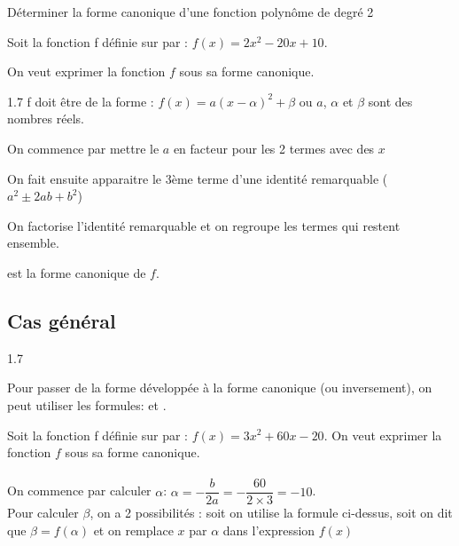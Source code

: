     \begin{bmethodet}{Déterminer la forme canonique d'une fonction polynôme de degré 2}
        
        Soit la fonction f définie sur \R par : $f(x)=2x^2-20x+10$.
        
        On veut exprimer la fonction $f$ sous sa forme canonique.
        
        
        \begin{spacing}{1.7}
        f doit être de la forme : 	
 		$f(x)=a(x-\alpha)^2+\beta$ 	
 		ou $a$, $\alpha$ et $\beta$ sont des nombres réels.
        
        On commence par mettre le $a$ en facteur pour les 2 termes avec des $x$
        
        \pointille[\textwidth]
          
        On fait ensuite apparaitre le 3ème terme d'une identité remarquable ($a^2\pm2ab+b^2$)
        
        \pointille[\textwidth]
        
        On factorise l'identité remarquable et on regroupe les termes qui restent ensemble.
        
        \pointille[\textwidth]
        
        \pointille[\textwidth]
        
        \pointille[\textwidth]

        \pointille[6cm] est la forme canonique de $f$.
    	\end{spacing}
    \end{bmethodet}


	\subsection{Cas général}
	
	\begin{spacing}{1.7}
	\begin{bprop}
		Pour passer de la forme développée à la forme canonique (ou inversement), on peut utiliser les formules:
		\pointille[5cm] et \pointille[5cm].\\
	\end{bprop}
	\end{spacing}

	\begin{bexemple}
		Soit la fonction f définie sur \R par : $f(x)=3x^2+60x-20$.
		On veut exprimer la fonction $f$ sous sa forme canonique.\\
		\ \\
		On commence par calculer $\alpha$:
		$\alpha=- \dfrac{b}{2a}=-\dfrac{60}{2\times 3}=-10$.
		\ \\
		Pour calculer $\beta$, on a 2 possibilités : soit on utilise la formule ci-dessus, soit on dit que $\beta=f(\alpha)$ et on remplace $x$ par $\alpha$ dans l'expression $f(x)$
	\end{bexemple}
    


